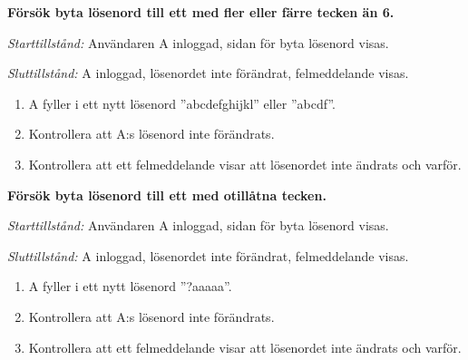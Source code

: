 \documentclass[a4paper]{article}
\begin{document}
\begin{FT}
\item
\textbf{Försök byta lösenord till ett med fler eller färre tecken än 6.}

\emph{Starttillstånd:} Användaren A inloggad, sidan för byta lösenord visas.

\emph{Sluttillstånd:} A inloggad, lösenordet inte förändrat, felmeddelande visas.

\begin{enumerate}
\item A fyller i ett nytt lösenord ''abcdefghijkl'' eller ''abcdf''.
\item Kontrollera att A:s lösenord inte förändrats.
\item Kontrollera att ett felmeddelande visar att lösenordet inte ändrats och varför.
\end{enumerate}

\item
\textbf{Försök byta lösenord till ett med otillåtna tecken.}

\emph{Starttillstånd:} Användaren A inloggad, sidan för byta lösenord visas.

\emph{Sluttillstånd:} A inloggad, lösenordet inte förändrat, felmeddelande visas.

\begin{enumerate}
\item A fyller i ett nytt lösenord ''?aaaaa''.
\item Kontrollera att A:s lösenord inte förändrats.
\item Kontrollera att ett felmeddelande visar att lösenordet inte ändrats och varför.
\end{enumerate}

\end{FT}
\end{document}
